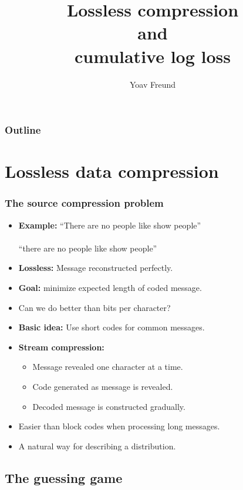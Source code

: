 \documentclass{beamer}
\title[log loss] %
{Lossless compression \\ and \\ cumulative log loss}
\author[Freund] %
{Yoav Freund}
\institute[Universities of Somewhere and Elsewhere] %
\begin{document}

\begin{frame}
  \titlepage
\end{frame}

\begin{frame}
  \frametitle{Outline}
  \tableofcontents[pausesections]
\end{frame}

\section{Lossless data compression}

\begin{frame}
\frametitle{The source compression problem}
\begin{itemize}
\item
{\bf Example:}
``There are no people like show people'' \\
\pause 
{} \\
\pause
{} ``there are no people like show people''
\item
{\bf Lossless:} Message reconstructed perfectly.
\item
{\bf Goal:} minimize expected length   of coded message. 
\item
Can we do better than  bits per character?
\item
{\bf Basic idea:} Use short codes for common messages.
\item
{\bf Stream compression:} 
\begin{itemize}
\item Message revealed one character at a time.
\item Code generated as message is revealed.
\item Decoded message is constructed gradually.
\end{itemize}
\item Easier than block codes when processing long messages.
\item A natural way for describing a distribution.
\end{itemize}
\end{frame}

\subsection{The guessing game}
\end{document}
